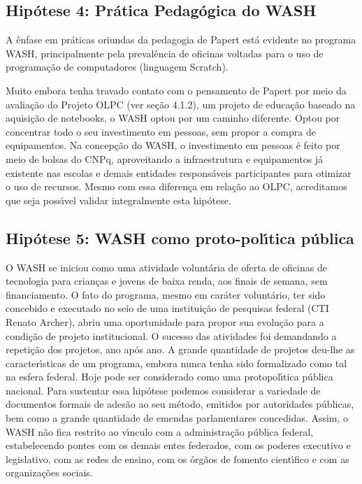 \documentclass[
12pt,		%
openright,	%
twoside,  %
a4paper,			%
chapter=TITLE,		%
english,			%
french,				%
spanish,			%
brazil				%
]{USPSC-classe/USPSC}
\begin{document}
\subsection[Hip\'otese 4: Pr\'atica Pedag\'ogica do WASH]{Hip\'otese 4: Pr\'atica Pedag\'ogica do WASH}\label{Hip\'otese 4: Pr\'atica Pedag\'ogica do WASH}
A \^enfase em pr\'aticas oriundas da pedagogia de Papert est\'a evidente no programa WASH, principalmente pela preval\^encia de oficinas voltadas para o uso de programa\c{c}\~ao de computadores (linguagem Scratch).








Muito embora tenha travado contato com o pensamento de Papert por meio da avalia\c{c}\~ao do Projeto OLPC (ver se\c{c}\~ao 4.1.2), um projeto de educa\c{c}\~ao baseado na aquisi\c{c}\~ao de notebooks, o WASH optou por um caminho diferente. Optou por concentrar todo o seu investimento em pessoas, sem propor a compra de equipamentos. Na concep\c{c}\~ao do WASH, o investimento em pessoas \'e feito por meio de bolsas do CNPq, aproveitando a infraestrutura e equipamentos j\'a existente nas escolas e demais entidades respons\'aveis participantes para otimizar o uso de recursos.  Mesmo com essa diferen\c{c}a em rela\c{c}\~ao ao OLPC, acreditamos que seja poss\'{\i}vel validar integralmente esta hip\'otese.








\subsection[Hip\'otese 5: WASH como proto-pol\'{\i}tica p\'ublica]{Hip\'otese 5: WASH como proto-pol\'{\i}tica p\'ublica}\label{Hip\'otese 5: WASH como proto-pol\'{\i}tica p\'ublica}
O WASH se iniciou como uma atividade volunt\'aria de oferta de oficinas de tecnologia para crian\c{c}as e jovens de baixa renda, aos finais de semana,  sem financiamento. O fato do programa, mesmo em car\'ater volunt\'ario, ter sido concebido e executado no seio de uma institui\c{c}\~ao de pesquisas federal (CTI Renato Archer), abriu uma oportunidade para propor sua evolu\c{c}\~ao para a condi\c{c}\~ao de projeto institucional. O sucesso das atividades foi demandando a repeti\c{c}\~ao dos projetos, ano ap\'os ano. A grande quantidade de projetos deu-lhe as caracter\'{\i}sticas de um programa, embora nunca tenha sido formalizado como tal na esfera federal.  Hoje pode ser considerado como uma protopol\'{\i}tica p\'ublica nacional. Para sustentar essa hip\'otese podemos considerar a variedade de documentos formais de ades\~ao ao seu m\'etodo, emitidos por autoridades p\'ublicas, bem como a grande quantidade de emendas parlamentares concedidas. Assim, o WASH n\~ao fica restrito ao v\'{\i}nculo com a administra\c{c}\~ao p\'ublica federal, estabelecendo pontes com os demais entes federados, com os poderes executivo e legislativo, com as redes de ensino, com os \'org\~aos de fomento cient\'{\i}fico e com as organiza\c{c}\~oes sociais.
\end{document}
